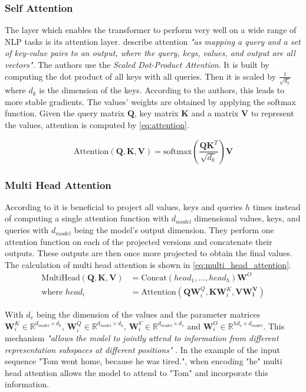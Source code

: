 \subsubsection{Self Attention}
The layer which enables the transformer to perform very well on a wide range of \ac{NLP} tasks is its attention layer.
\Textcite{Vaswani:2017} describe attention \textit{"as mapping a query and a set of key-value pairs to an output, where the query, keys, values, and output are all vectors"}.
The authors use the \textit{Scaled Dot-Product Attention}.
It is built by computing the dot product of all keys with all queries.
Then it is scaled by $\frac{1}{\sqrt{d_k}}$ where $d_k$ is the dimension of the keys.
According to the authors, this leads to more stable gradients.
The values' weights are obtained by applying the softmax function.
Given the query matrix $\bm{Q}$, key matrix $\bm{K}$ and a matrix $\bm{V}$ to represent the values, attention is computed by \cref{eq:attention}.


\begin{equation}\label{eq:attention}
    \text{Attention}(\bm{Q},\bm{K},\bm{V}) = \text{softmax}(\frac{\bm{Q}\bm{K}^T}{\sqrt{d_k}}) \bm{V}
\end{equation}

\subsubsection{Multi Head Attention}
According to \textcite{Vaswani:2017} it is beneficial to project all values, keys and queries $h$ times instead of computing a single attention function with $d_{model}$ dimensional values, keys, and queries with $d_{model}$ being the model's output dimension.
They perform one attention function on each of the projected versions and concatenate their outputs.
These outputs are then once more projected to obtain the final values.
The calculation of multi head attention is shown in \cref{eq:multi_head_attention}.
\begin{equation}\label{eq:multi_head_attention}
    \begin{aligned}
        \text{MultiHead}(\bm{Q},\bm{K},\bm{V}) &= \text{Concat}(head_1,\dots, head_h)\bm{W}^O\\
        \text{where }head_i &= \text{Attention}(\bm{Q}\bm{W}^Q_i, \bm{K}\bm{W}^K_i, \bm{V}\bm{W^V_i})
    \end{aligned}
\end{equation}

With $d_v$ being the dimension of the values and the parameter matrices $\bm{W}^K_i \in \mathbb{R}^{d_{model} \times d_k}$, $\bm{W}^Q_i \in \mathbb{R}^{d_{model} \times d_k}$, $\bm{W}^V_i \in \mathbb{R}^{d_{model} \times d_v}$ and $\bm{W}^O_i \in \mathbb{R}^{hd_v \times d_{model}}$.
This mechanism \textit{"allows the model to jointly attend to information from different representation subspaces at different positions"} \parencite{Vaswani:2017}.
In the example of the input sequence "Tom went home, because he was tired.", when encoding "he" multi head attention allows the model to attend to "Tom" and incorporate this information.
